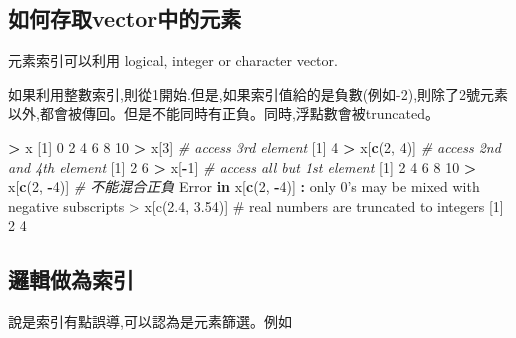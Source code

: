 \documentclass[]{book}
\newenvironment{Shaded}{\begin{snugshade}}{\end{snugshade}}
\newcommand{\KeywordTok}[1]{\textcolor[rgb]{0.13,0.29,0.53}{\textbf{#1}}}
\newcommand{\DecValTok}[1]{\textcolor[rgb]{0.00,0.00,0.81}{#1}}
\newcommand{\StringTok}[1]{\textcolor[rgb]{0.31,0.60,0.02}{#1}}
\newcommand{\CommentTok}[1]{\textcolor[rgb]{0.56,0.35,0.01}{\textit{#1}}}
\newcommand{\ControlFlowTok}[1]{\textcolor[rgb]{0.13,0.29,0.53}{\textbf{#1}}}
\newcommand{\OperatorTok}[1]{\textcolor[rgb]{0.81,0.36,0.00}{\textbf{#1}}}
\newcommand{\NormalTok}[1]{#1}
\theoremstyle{definition}
\theoremstyle{definition}
\theoremstyle{definition}
\theoremstyle{remark}
\begin{document}
\subsection{如何存取vector中的元素}\label{vector}

元素索引可以利用 logical, integer or character vector.

如果利用整數索引,則從1開始.但是,如果索引值給的是負數(例如-2),則除了2號元素以外,都會被傳回。但是不能同時有正負。同時,浮點數會被truncated。

\begin{Shaded}
\begin{Highlighting}[]
\OperatorTok{>}\StringTok{ }\NormalTok{x}
\NormalTok{[}\DecValTok{1}\NormalTok{]  }\DecValTok{0}  \DecValTok{2}  \DecValTok{4}  \DecValTok{6}  \DecValTok{8} \DecValTok{10}
\OperatorTok{>}\StringTok{ }\NormalTok{x[}\DecValTok{3}\NormalTok{]           }\CommentTok{# access 3rd element}
\NormalTok{[}\DecValTok{1}\NormalTok{] }\DecValTok{4}
\OperatorTok{>}\StringTok{ }\NormalTok{x[}\KeywordTok{c}\NormalTok{(}\DecValTok{2}\NormalTok{, }\DecValTok{4}\NormalTok{)]     }\CommentTok{# access 2nd and 4th element}
\NormalTok{[}\DecValTok{1}\NormalTok{] }\DecValTok{2} \DecValTok{6}
\OperatorTok{>}\StringTok{ }\NormalTok{x[}\OperatorTok{-}\DecValTok{1}\NormalTok{]          }\CommentTok{# access all but 1st element}
\NormalTok{[}\DecValTok{1}\NormalTok{]  }\DecValTok{2}  \DecValTok{4}  \DecValTok{6}  \DecValTok{8} \DecValTok{10}
\OperatorTok{>}\StringTok{ }\NormalTok{x[}\KeywordTok{c}\NormalTok{(}\DecValTok{2}\NormalTok{, }\OperatorTok{-}\DecValTok{4}\NormalTok{)]    }\CommentTok{# 不能混合正負}
\NormalTok{Error }\ControlFlowTok{in}\NormalTok{ x[}\KeywordTok{c}\NormalTok{(}\DecValTok{2}\NormalTok{, }\OperatorTok{-}\DecValTok{4}\NormalTok{)] }\OperatorTok{:}\StringTok{ }\NormalTok{only }\DecValTok{0}\StringTok{'s may be mixed with negative subscripts}
\StringTok{> x[c(2.4, 3.54)]    # real numbers are truncated to integers}
\StringTok{[1] 2 4}
\end{Highlighting}
\end{Shaded}

\subsection{邏輯做為索引}

說是索引有點誤導,可以認為是元素篩選。例如
\end{document}
